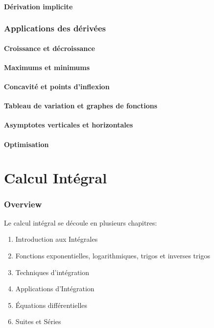 \documentclass{article}
\begin{document}
\subsection{Dérivation implicite}

\section{Applications des dérivées}
\subsection{Croissance et décroissance}
\subsection{Maximums et minimums}
\subsection{Concavité et points d’inflexion}
\subsection{Tableau de variation et graphes de fonctions}
\subsection{Asymptotes verticales et horizontales}
\subsection{Optimisation}

\pagebreak

\part{Calcul Intégral}

\section{Overview}

Le calcul intégral se découle en plusieurs chapitres:
\begin{enumerate}
    \item Introduction aux Intégrales
    \item Fonctions exponentielles, logarithmiques, trigos et inverses trigos
    \item Techniques d'intégration
    \item Applications d'Intégration
    \item Équations différentielles
    \item Suites et Séries
\end{enumerate}
\end{document}
